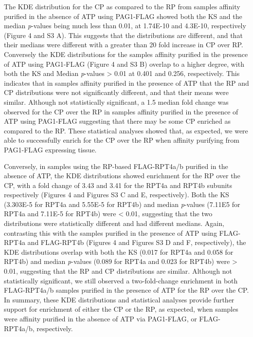 The KDE distribution for the CP as compared to the RP from samples affinity purified in the absence of ATP using PAG1-FLAG showed both the KS and the median \textit{p}-values being much less than 0.01, at 1.74E-10 and 4.3E-10, respectively (Figure 4 and S3 A). This suggests that the distributions are different, and that their medians were different with a greater than 20 fold increase in CP over RP. Conversely the KDE distributions for the samples affinity purified in the presence of ATP using PAG1-FLAG (Figure 4 and S3 B) overlap to a higher degree, with both the KS and Median \textit{p}-values > 0.01 at 0.401 and 0.256, respectively. This indicates that in samples affinity purified in the presence of ATP that the RP and CP distributions were not significantly different, and that their means were similar. Although not statistically significant, a 1.5 median fold change was observed for the CP over the RP in samples affinity purified in the presence of ATP using PAG1-FLAG suggesting that there may be some CP enriched as compared to the RP. These statistical analyses showed that, as expected, we were able to successfully enrich for the CP over the RP when affinity purifying from PAG1-FLAG expressing tissue.

	Conversely, in samples using the RP-based FLAG-RPT4a/b purified in the absence of ATP, the KDE distributions showed enrichment for the RP over the CP, with a fold change of 3.43 and 3.41 for the RPT4a and RPT4b subunits respectively (Figures 4 and Figures S3 C and E, respectively). Both the KS (3.303E-5 for RPT4a and 5.55E-5 for RPT4b) and median \textit{p}-values (7.11E5 for RPT4a and 7.11E-5 for RPT4b) were < 0.01, suggesting that the two distributions were statistically different and had different medians. Again, contrasting this with the samples purified in the presence of ATP using FLAG-RPT4a and FLAG-RPT4b (Figures 4 and Figures S3 D and F, respectively), the KDE distributions overlap with both the KS (0.017 for RPT4a and 0.058 for RPT4b) and median \textit{p}-values (0.089 for RPT4a and 0.023 for RPT4b) were > 0.01, suggesting that the RP and CP distributions are similar. Although not statistically significant, we still observed a two-fold-change enrichment in both FLAG-RPT4a/b samples purified in the presence of ATP for the RP over the CP. In summary, these KDE distributions and statistical analyses provide further support for enrichment of either the CP or the RP, as expected, when samples were affinity purified in the absence of ATP via PAG1-FLAG, or FLAG-RPT4a/b, respectively.

